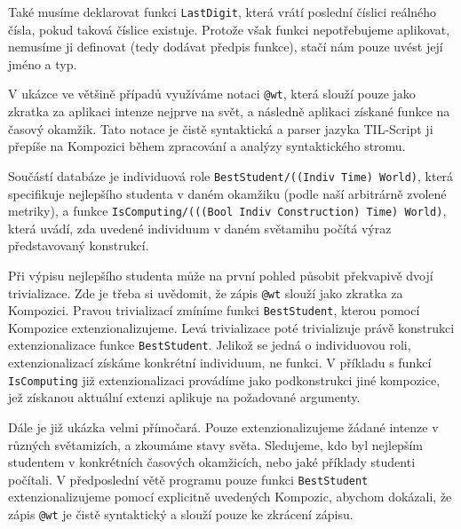 Také musíme deklarovat funkci \lstinline{LastDigit}, která vrátí poslední číslici reálného čísla,
pokud taková číslice existuje. Protože však funkci nepotřebujeme aplikovat, nemusíme ji definovat
(tedy dodávat předpis funkce), stačí nám pouze uvést její jméno a typ.

V ukázce ve většině případů využíváme notaci \lstinline{@wt}, která slouží pouze jako zkratka
za aplikaci intenze nejprve na svět, a následně aplikaci získané funkce na časový okamžik. Tato
notace je čistě syntaktická a parser jazyka TIL-Script ji přepíše na Kompozici během zpracování
a analýzy syntaktického stromu.

Součástí databáze je individuová role \lstinline{BestStudent/((Indiv Time) World)}, která
specifikuje nejlepšího studenta v daném okamžiku (podle naší arbitrárně zvolené metriky), a
funkce \lstinline{IsComputing/(((Bool Indiv Construction) Time) World)}, která uvádí, zda
uvedené individuum v daném světamihu počítá výraz představovaný konstrukcí.

Při výpisu nejlepšího studenta může na první pohled působit překvapivě dvojí trivializace. Zde je
třeba si uvědomit, že zápis \lstinline{@wt} slouží jako zkratka za Kompozici. Pravou trivializací
zmíníme funkci \lstinline{BestStudent}, kterou pomocí Kompozice extenzionalizujeme. Levá
trivializace poté trivializuje právě konstrukci extenzionalizace funkce \lstinline{BestStudent}.
Jelikož se jedná o individuovou roli, extenzionalizací získáme konkrétní individuum, ne funkci.
V příkladu s funkcí \lstinline{IsComputing} již extenzionalizaci provádíme jako podkonstrukci jiné
kompozice, jež získanou aktuální extenzi aplikuje na požadované argumenty.

Dále je již ukázka velmi přímočará. Pouze extenzionalizujeme žádané intenze v různých světamizích,
a zkoumáme stavy světa. Sledujeme, kdo byl nejlepším studentem v konkrétních časových okamžicích,
nebo jaké příklady studenti počítali. V předposlední větě programu pouze funkci
\lstinline{BestStudent} extenzionalizujeme pomocí explicitně uvedených Kompozic, abychom dokázali,
že zápis \lstinline{@wt} je čistě syntaktický a slouží pouze ke zkrácení zápisu.

